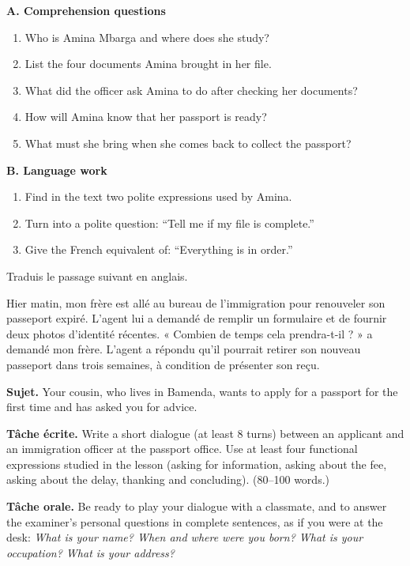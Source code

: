 \documentclass[11pt]{article}
\begin{document}
\begin{exercice}
\textbf{A. Comprehension questions}
\begin{enumerate}
\item Who is Amina Mbarga and where does she study?
\item List the four documents Amina brought in her file.
\item What did the officer ask Amina to do after checking her documents?
\item How will Amina know that her passport is ready?
\item What must she bring when she comes back to collect the passport?
\end{enumerate}

\textbf{B. Language work}
\begin{enumerate}
\item Find in the text two polite expressions used by Amina.
\item Turn into a polite question: “Tell me if my file is complete.”
\item Give the French equivalent of: “Everything is in order.”
\end{enumerate}
\end{exercice}

\begin{exercice}
Traduis le passage suivant en anglais.
\end{exercice}

\begin{textebox}
Hier matin, mon frère est allé au bureau de l'immigration pour renouveler son passeport expiré. L'agent lui a demandé de remplir un formulaire et de fournir deux photos d'identité récentes. « Combien de temps cela prendra-t-il ? » a demandé mon frère. L'agent a répondu qu'il pourrait retirer son nouveau passeport dans trois semaines, à condition de présenter son reçu.
\end{textebox}

\begin{exercice}
\textbf{Sujet.} Your cousin, who lives in Bamenda, wants to apply for a passport for the first time and has asked you for advice.

\textbf{Tâche écrite.} Write a short dialogue (at least 8 turns) between an applicant and an immigration officer at the passport office. Use at least four functional expressions studied in the lesson (asking for information, asking about the fee, asking about the delay, thanking and concluding). (80--100 words.)

\textbf{Tâche orale.} Be ready to play your dialogue with a classmate, and to answer the examiner's personal questions in complete sentences, as if you were at the desk: \emph{What is your name? When and where were you born? What is your occupation? What is your address?}
\end{exercice}
\end{document}
